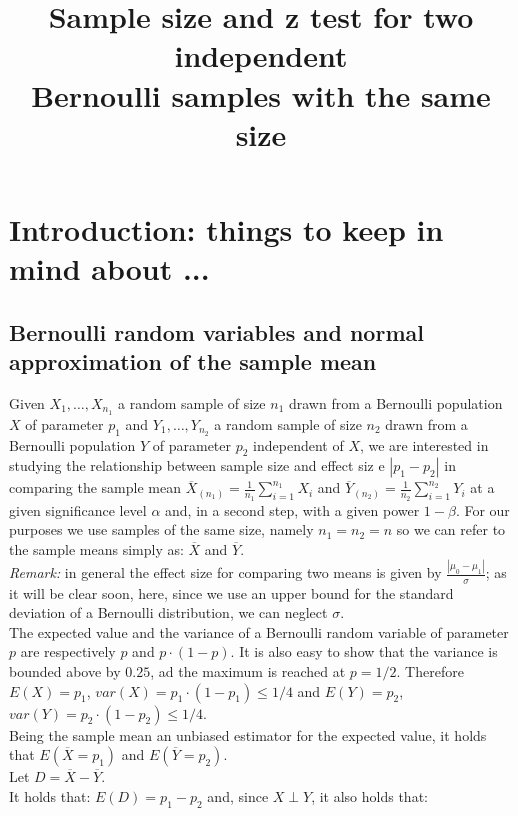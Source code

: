 \documentclass[14pt]{article}
\title{ Sample size and z test for two independent \\Bernoulli samples with the same size}
\author{}
\date{}
\begin{document}
\maketitle

\section{Introduction: things to keep in mind about ...}
\subsection{Bernoulli random variables and normal approximation of the sample mean}\label{bernoulli}
Given $X_{1},\dots,X_{n_{1}}$ a random sample of size $n_{1}$ drawn from a Bernoulli population $X$ of parameter $p_{1}$ and $Y_{1},\dots,Y_{n_{2}}$ a random sample of size $n_{2}$ drawn from a Bernoulli population $Y$ of parameter $p_{2}$ independent of  $X$, we are interested in studying the relationship between sample size and effect siz e $\left | p_{1}-p_{2}\right |$ in comparing the sample mean $\overline{X}_{(n_{1})}=\frac{1}{n_{1}} \sum_{i=1}^{n_{1}} X_i$ and $\overline{Y}_{(n_{2})}=\frac{1}{n_{2}} \sum_{i=1}^{n_{2}}Y_i$ at a given significance level $\alpha$ and, in a second step, with a given power $1-\beta$. 
For our purposes we use samples of the same size, namely $n_{1}=n_{2}=n$ so we can refer to the sample means simply as: $\overline{X}$ and $\overline{Y}$.\\
\textit{Remark: }in general the effect size for comparing two means is given by $\frac{\left |\mu_{0}-\mu_{1}\right |}{\sigma}$; as it will be clear soon, here, since we use an upper bound for the standard deviation of a Bernoulli distribution, we can neglect ${\sigma}$.\\
\newline
The expected value and the variance of a Bernoulli random variable of parameter $p$ are respectively  $p$ and $p\cdot(1-p)$. It is also  easy to show that the variance is bounded above by $0.25$, ad the maximum is reached at $p=1/2$.
 Therefore  $E(X)=p_{1}$, $var(X)= p_{1}\cdot(1-p_{1})\leq1/4$ and $E(Y)=p_{2}$, $var(Y)= p_{2}\cdot(1-p_{2})\leq1/4$. \\
Being the sample mean an unbiased estimator for the expected value, it holds that $E(\overline{X}=p_{1})$ and $E(\overline{Y}=p_{2})$.\\
\newline
Let $D=\overline{X}-\overline{Y}$.\\
It holds that: $E(D)=p_{1}-p_{2}$ and, since $X\perp Y$, it also holds that: \\
\end{document}
